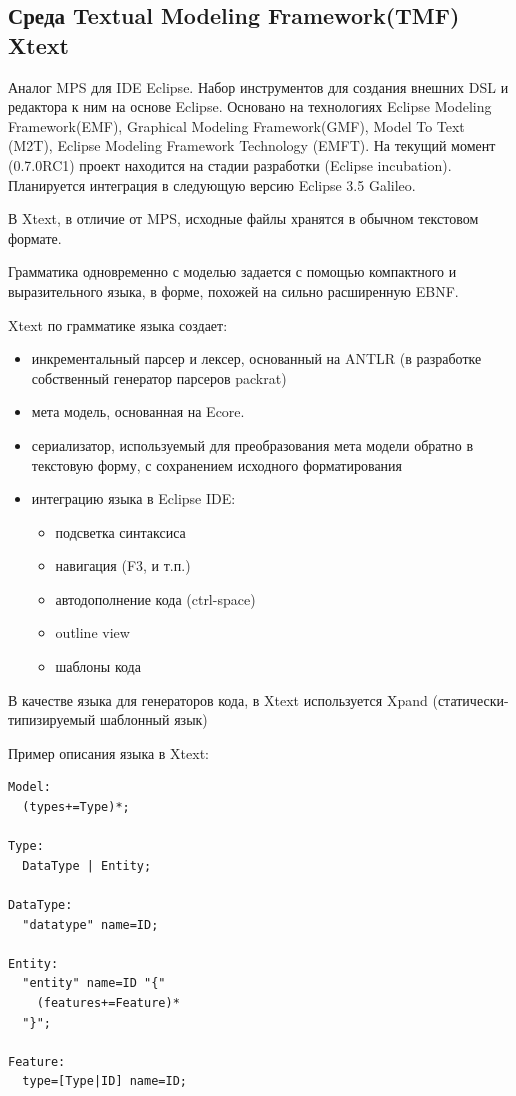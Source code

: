 \documentclass[a4paper,12pt]{article}
\begin{document}
\subsection{Среда Textual Modeling Framework(TMF) Xtext}
Аналог MPS для IDE Eclipse.
Набор инструментов для создания внешних DSL и редактора к ним на основе Eclipse.
Основано на технологиях Eclipse Modeling Framework(EMF), Graphical Modeling
Framework(GMF), Model To Text (M2T), Eclipse Modeling Framework Technology
(EMFT). На текущий момент (0.7.0RC1) проект находится на стадии разработки
(Eclipse incubation). Планируется интеграция в следующую версию Eclipse 3.5
Galileo.

В Xtext, в отличие от MPS, исходные файлы хранятся в обычном текстовом формате.

Грамматика одновременно с моделью задается с помощью компактного и
выразительного языка, в форме, похожей на сильно расширенную EBNF.

Xtext по грамматике языка создает:
\begin{itemize}
  \item инкрементальный парсер и лексер, основанный на ANTLR (в разработке
  собственный генератор парсеров packrat)
  \item мета модель, основанная на Ecore.
  \item сериализатор, используемый для преобразования мета модели обратно в
  текстовую форму, с сохранением исходного форматирования 
  \item интеграцию языка в Eclipse IDE:
  \begin{itemize}
    \item подсветка синтаксиса
    \item навигация (F3, и т.п.)
    \item автодополнение кода (ctrl-space)
    \item outline view
    \item шаблоны кода
  \end{itemize}
\end{itemize}

В качестве языка для генераторов кода, в Xtext используется Xpand
(статически-типизируемый шаблонный язык)

\begin{example}
Пример описания языка в Xtext:
\end{example}
\begin{verbatim}
Model:
  (types+=Type)*;

Type:
  DataType | Entity;

DataType:
  "datatype" name=ID;

Entity:
  "entity" name=ID "{"
    (features+=Feature)* 
  "}";

Feature:
  type=[Type|ID] name=ID;   
\end{verbatim}
\end{document}
